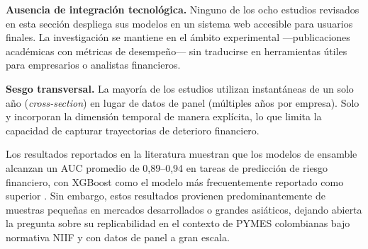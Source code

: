\documentclass[12pt, letterpaper]{article}
\begin{document}
\textbf{Ausencia de integraci\'on tecnol\'ogica.} Ninguno de los ocho estudios revisados en esta secci\'on despliega sus modelos en un sistema web accesible para usuarios finales. La investigaci\'on se mantiene en el \'ambito experimental ---publicaciones acad\'emicas con m\'etricas de desempe\~no--- sin traducirse en herramientas \'utiles para empresarios o analistas financieros.

\textbf{Sesgo transversal.} La mayor\'ia de los estudios utilizan instant\'aneas de un solo a\~no (\textit{cross-section}) en lugar de datos de panel (m\'ultiples a\~nos por empresa). Solo \citet{Bortolotti2024} y \citet{Mahesh2025} incorporan la dimensi\'on temporal de manera expl\'icita, lo que limita la capacidad de capturar trayectorias de deterioro financiero.

Los resultados reportados en la literatura muestran que los modelos de ensamble alcanzan un AUC promedio de 0,89--0,94 en tareas de predicci\'on de riesgo financiero, con XGBoost como el modelo m\'as frecuentemente reportado como superior \citep{Dasilas2024, Boumhidi2025, ChenGuestrin2016}. Sin embargo, estos resultados provienen predominantemente de muestras peque\~nas en mercados desarrollados o grandes asi\'aticos, dejando abierta la pregunta sobre su replicabilidad en el contexto de PYMES colombianas bajo normativa NIIF y con datos de panel a gran escala.
\end{document}
